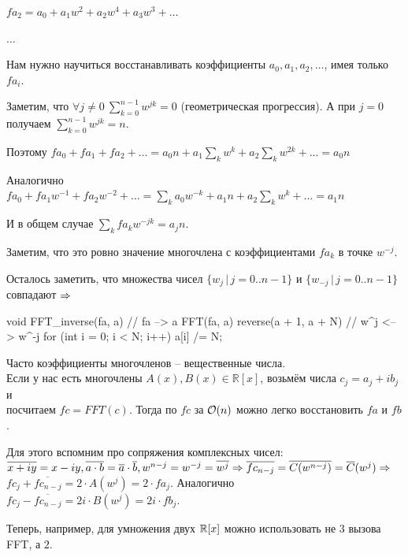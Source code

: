 $fa_2 = a_0 + a_1w^2 + a_2w^4 + a_3w^3 + \dots$

$\dots$

Нам нужно научиться восстанавливать коэффициенты $a_0, a_1, a_2, \dots$, имея только $fa_i$.

Заметим, что $\forall j \not= 0 \ \sum\limits_{k=0}^{n-1} w^{jk} = 0$ (геометрическая прогрессия). А при $j = 0$ получаем $\sum\limits_{k=0}^{n-1} w^{jk} = n$.

\down
Поэтому $fa_0 + fa_1 + fa_2 + \dots = a_0n + a_1\sum_k w^k + a_2 \sum_k w^{2k} + \dots = a_0n$

Аналогично $fa_0 + fa_1w^{-1} + fa_2w^{-2} + \dots = \sum_k a_0 w^{-k} + a_1n + a_2 \sum_k w^{k} + \dots = a_1n$

И в общем случае $\sum_k fa_kw^{-jk} = a_jn$. 

Заметим, что это ровно значение многочлена с коэффициентами $fa_k$ в точке $w^{-j}$.

Осталось заметить, что множества чисел $\{w_j\,|\,j=0..n{-}1\}$ и $\{w_{-j}\,|\,j=0..n{-}1\}$ совпадают $\Rightarrow$

\down
\begin{code}
void FFT_inverse(fa, a) { // fa --> a
  FFT(fa, a)
  reverse(a + 1, a + N) // w^j <--> w^{-j}
  for (int i = 0; i < N; i++) a[i] /= N;
}
\end{code}


Часто коэффициенты многочленов -- вещественные числа. \\
Если у нас есть многочлены $A(x), B(x) \in \mathbb{R}[x]$,
возьмём числа $c_j = a_j + ib_j$ и \\ 
посчитаем $fc = FFT(c)$.
Тогда по $fc$ за $\mathcal{O}(n)$ можно легко восстановить $fa$ и $fb$.

\down
Для этого вспомним про сопряжения комплексных чисел: \\
$\overline{x + iy} = x - iy, \overline{a \cdot b} = \overline{a} \cdot \overline{b}, w^{n-j} = w^{-j} = \overline{w^j} \Rightarrow
\overline{fc_{n-j}} = \overline{C(w^{n-j})} = \overline{C}(w^j) \Rightarrow$\\
$fc_j + \overline{fc_{n-j}} = 2 \cdot A(w^j) = 2 \cdot fa_j$. Аналогично $fc_j - \overline{fc_{n-j}} = 2i \cdot B(w^j) = 2i \cdot fb_j$.

\down
Теперь, например, для умножения двух $\mathbb{R}[x]$ можно использовать не $3$ вызова FFT, а $2$.


